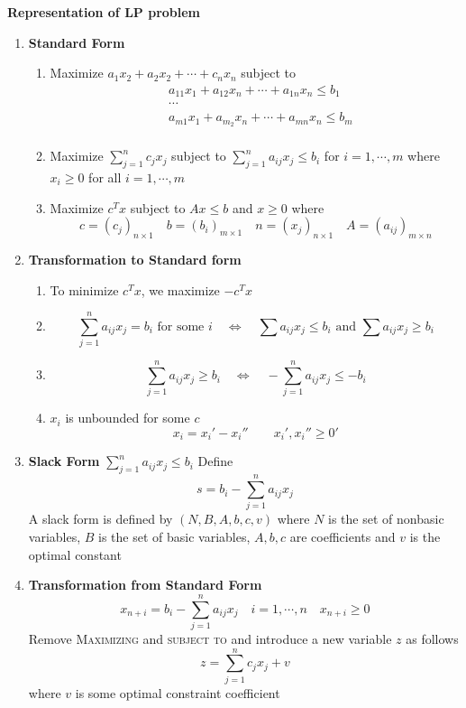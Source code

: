 \documentclass[11pt]{article}
\begin{document}
\begin{defn*}
    \textbf{Representation of LP problem}
    \begin{enumerate}
        \item \textbf{Standard Form} 
        \begin{enumerate}
            \item Maximize $a_1 x_2 + a_2 x_2 + \cdots + c_n x_n$ subject to 
        \begin{align*}
            & a_{11}x_1 + a_{12}x_n + \cdots + a_{1n} x_n\leq b_1 \\
            & \cdots                                              \\  
            & a_{m1}x_1 + a_{m_2}x_n + \cdots + a_{mn} x_n \leq b_m \\
        \end{align*}
            \item Maximize $\sum_{j=1}^n c_j x_j$ subject to $\sum_{j=1}^n a_{ij} x_j \leq b_i$ for $i = 1,\cdots, m$ where $x_i \geq 0$ for all $i = 1,\cdots, m$
            \item Maximize $c^T x$ subject to $Ax \leq b$ and $x\geq 0$ where 
            \[
                c = (c_j)_{n\times 1}   \quad b = (b_i)_{m\times 1} \quad n = (x_j)_{n\times 1} \quad A = (a_{ij})_{m\times n}
            \]
        \end{enumerate}
        \item \textbf{Transformation to Standard form} 
            \begin{enumerate}
                \item To minimize $c^Tx$, we maximize $-c^Tx$
                \item 
                \[
                    \sum_{j=1}^n a_{ij}x_j = b_i \text{ for some } i \quad \iff \quad \sum a_{ij} x_j \leq b_i \text{ and } \sum a_{ij} x_j \geq b_i
                \]
                \item 
                \[
                    \sum_{j=1}^n a_{ij} x_j \geq b_i \quad \iff \quad -\sum_{j=1}^n a_{ij} x_j \leq -b_i 
                \]
                \item $x_i$ is unbounded for some $c$
                \[
                    x_i = x_i' - x_i '' \quad \quad x_i', x_i'' \geq 0'
                \]
            \end{enumerate}
        \item \textbf{Slack Form} $\sum_{j=1}^n a_{ij} x_j \leq b_i$ Define 
        \[
            s = b_i - \sum_{j=1}^n a_{ij} x_j
        \]
        A slack form is defined by $(N,B,A,b,c,v)$ where $N$ is the set of nonbasic variables, $B$ is the set of basic variables, $A,b,c$ are coefficients and $v$ is the optimal constant
        \item \textbf{Transformation from Standard Form} 
        \[
            x_{n+i} = b_i - \sum_{j=1}^n a_{ij} x_j \quad i = 1,\cdots, n \quad x_{n + i} \geq 0
        \]
        Remove \textsc{Maximizing} and \textsc{subject to} and introduce a new variable $z$ as follows 
        \[
            z = \sum_{j=1}^nc_j x_j + v 
        \]
        where $v$ is some optimal constraint coefficient
    \end{enumerate}
\end{defn*}
\end{document}
